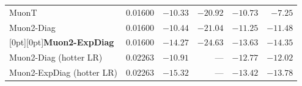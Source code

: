 \begin{table}[tbp]
\begin{tabularx}{\textwidth}{@{}>{\raggedright\arraybackslash}Xrrrrr@{}}
MuonT & 0.01600 & $-10.33$ & $-20.92$ & $-10.73$ & $-7.25$ \\
Muon2-Diag & 0.01600 & $-10.44$ & $-21.04$ & $-11.25$ & $-11.48$ \\
\rowcolor{rowtint}[0pt][0pt]\textbf{Muon2-ExpDiag} & 0.01600 & $\mathbf{-14.27}$ & $\mathbf{-24.63}$ & $\mathbf{-13.63}$ & $\mathbf{-14.35}$ \\
Muon2-Diag (hotter LR) & 0.02263 & $-10.91$ & --- & $-12.77$ & $-12.02$ \\
Muon2-ExpDiag (hotter LR) & 0.02263 & $-15.32$ & --- & $-13.42$ & $-13.78$ \\
\bottomrule\end{tabularx}
\end{table}
